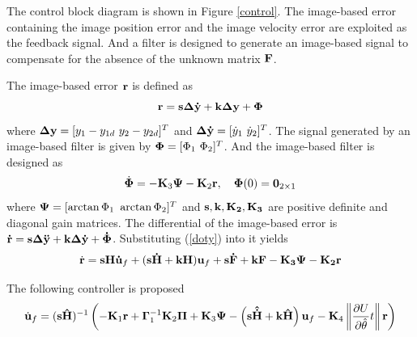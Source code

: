 \documentclass[12pt,a4paper]{article}
\begin{document}
\indent The control block diagram is shown in Figure \ref{control}. The image-based error containing the image position error and the image velocity error are exploited as the feedback signal. And a filter is designed to generate an image-based signal to compensate for the absence of the unknown matrix $\bf F$.

\indent The image-based error $\bf r$ is defined as
\begin{equation}
{\bf r}=\bf s\Delta \dot y +k\Delta y+\Phi
\end{equation}
where $ {\bf\Delta y}=[y_1-y_{1d}\ y_2-y_{2d}]^T$ and ${\bf\Delta \dot y}=[\dot y_1 \ \dot y_2]^T$. The signal generated by an image-based filter is given by ${\bf \Phi}=[\Phi_1\  \Phi_2]^T$. And the image-based filter is designed as
\begin{equation}
\dot{\bf \Phi }=-{\bf K}_3{\bf \Psi}-{\bf K}_2{\bf r},\quad {\bf \Phi}(0)={\bf 0}_{2\times1}
\end{equation}
where ${\bf \Psi}=[\arctan\Phi_1\ \arctan\Phi_2]^T$ and $\bf s, k, K_2, K_3$ are positive definite and diagonal gain matrices. The differential of the image-based error is $\bf \dot r=s\Delta \ddot y+k\Delta\dot y+\dot\Phi$. Substituting (\ref{doty}) into it yields
\begin{equation}
\dot {\bf r}={\bf sH\dot u}_f+({\bf s\dot H +kH}){\bf u}_f+\bf s\dot F+kF-K_3 \Psi-K_2 r
\end{equation}



\indent The following controller is proposed
\begin{equation}
\dot{\bf u}_f=({\bf s\hat H})^{-1}
\left(
-{\bf K}_1{\bf r}+{\bf \Gamma}^{-1}_1{\bf K}_2{\bf \Pi}+{\bf K}_3{\bf \Psi}
-\left({\bf s\hat{\dot H}+k\hat H}\right){\bf u}_f-{\bf K}_4\left\|\frac{\partial U}{\partial \hat \theta}t\right\|{\bf r}
\right)
\end{equation}
\end{document}
